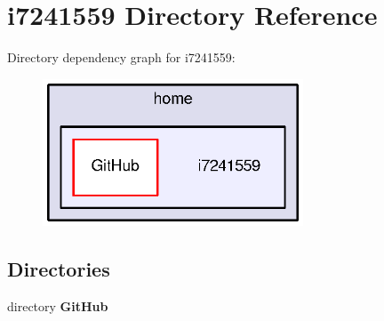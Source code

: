 \section{i7241559 Directory Reference}
\label{dir_b8aed5b4d09b18e4dde27e9a9ac1bce0}
Directory dependency graph for i7241559\-:
\nopagebreak
\begin{figure}[H]
\begin{center}
\leavevmode
\includegraphics[width=220pt]{dir_b8aed5b4d09b18e4dde27e9a9ac1bce0_dep}
\end{center}
\end{figure}
\subsection*{Directories}
\begin{DoxyCompactItemize}
\item 
directory {\bf Git\-Hub}
\end{DoxyCompactItemize}
